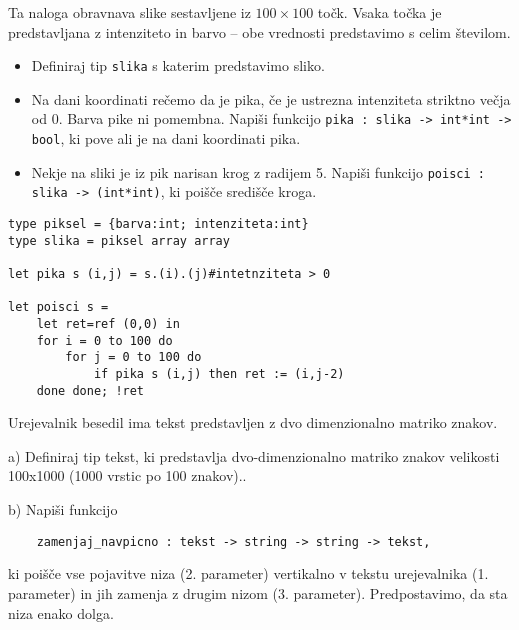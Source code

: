 \begin{ex}
Ta naloga obravnava slike sestavljene iz $100\times 100$ to\v ck.
Vsaka to\v cka je predstavljana z intenziteto in
  barvo -- obe vrednosti predstavimo s celim \v stevilom.
  \begin{itemize}
      \item Definiraj tip \lstinline{slika} s katerim predstavimo sliko.
      \item Na dani koordinati re\v cemo da je pika, \v ce je ustrezna intenziteta striktno ve\v cja od 0.  Barva pike ni pomembna.
Napi\v si funkcijo \lstinline{pika : slika -> int*int -> bool}, 
  ki pove ali je na dani koordinati pika.
  \item   Nekje na sliki je iz pik narisan krog z radijem 5. Napi\v si funkcijo
  \lstinline{poisci : slika -> (int*int)}, ki poi\v s\v ce sredi\v s\v ce
  kroga.
  \end{itemize}
 
 \begin{sol}
\begin{lstlisting}
type piksel = {barva:int; intenziteta:int}
type slika = piksel array array
 
let pika s (i,j) = s.(i).(j)#intetnziteta > 0

let poisci s = 
    let ret=ref (0,0) in
    for i = 0 to 100 do 
        for j = 0 to 100 do
            if pika s (i,j) then ret := (i,j-2)
    done done; !ret
\end{lstlisting}
 \end{sol}
 
\end{ex} 




\begin{ex}
  Urejevalnik besedil ima tekst predstavljen z dvo dimenzionalno
  matriko znakov.

  a) Definiraj tip tekst, ki predstavlja dvo-dimenzionalno matriko
  znakov velikosti 100x1000 (1000 vrstic po 100 znakov)..

  b) Napi\v si funkcijo

\begin{lstlisting}
    zamenjaj_navpicno : tekst -> string -> string -> tekst, 
\end{lstlisting}
  ki poi\v s\v ce vse pojavitve niza (2. parameter) vertikalno v
  tekstu urejevalnika (1. parameter) in jih zamenja z drugim nizom
  (3. parameter). Predpostavimo, da sta niza enako dolga.
\end{ex} 





